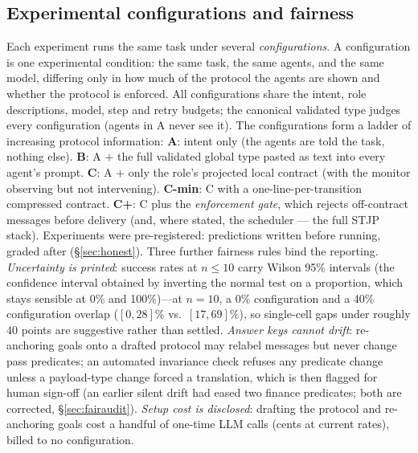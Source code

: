 \documentclass{article}
\newcommand{\stjp}{\textsc{STJP}}
\begin{document}
\subsection{Experimental configurations and fairness}
Each experiment runs the same task under several \emph{configurations}. A configuration is one experimental condition: the same task, the same agents, and the same model, differing only in how much of the protocol the agents are shown and whether the protocol is enforced. All configurations share the intent, role descriptions, model, step and retry budgets; the canonical validated type judges every configuration (agents in A never see it). The configurations form a ladder of increasing protocol information: \textbf{A}: intent only (the agents are told the task, nothing else). \textbf{B}: A $+$ the full validated global type pasted as text into every agent's prompt. \textbf{C}: A $+$ only the role's projected local contract (with the monitor observing but not intervening). \textbf{C-min}: C with a one-line-per-transition compressed contract. \textbf{C+}: C plus the \emph{enforcement gate}, which rejects off-contract messages before delivery (and, where stated, the scheduler --- the full \stjp{} stack). Experiments were pre-registered: predictions written before running, graded after (\S\ref{sec:honest}). Three further fairness rules bind the reporting. \emph{Uncertainty is printed}: success rates at $n{\leq}10$ carry Wilson 95\% intervals (the confidence interval obtained by inverting the normal test on a proportion, which stays sensible at 0\% and 100\%)---at $n{=}10$, a 0\% configuration and a 40\% configuration overlap ($[0,28]\%$ vs.\ $[17,69]\%$), so single-cell gaps under roughly 40 points are suggestive rather than settled. \emph{Answer keys cannot drift}: re-anchoring goals onto a drafted protocol may relabel messages but never change pass predicates; an automated invariance check refuses any predicate change unless a payload-type change forced a translation, which is then flagged for human sign-off (an earlier silent drift had eased two finance predicates; both are corrected, \S\ref{sec:fairaudit}). \emph{Setup cost is disclosed}: drafting the protocol and re-anchoring goals cost a handful of one-time LLM calls (cents at current rates), billed to no configuration.
\end{document}
